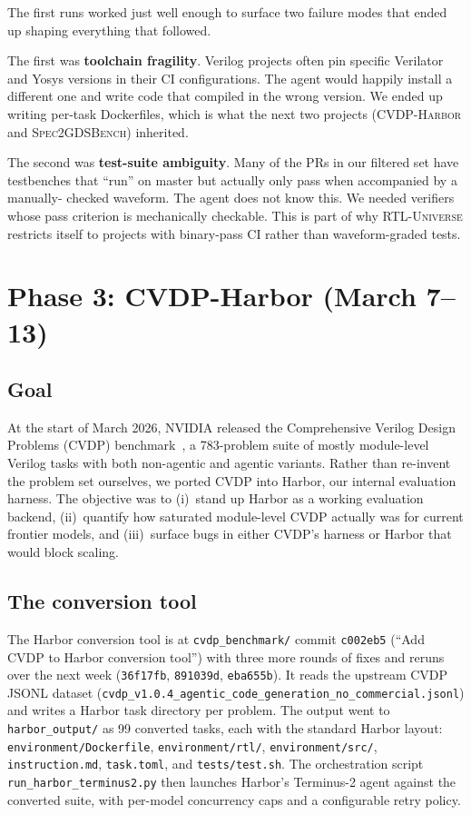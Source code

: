 \documentclass{article}
\begin{document}
The first runs worked just well enough to surface two failure modes that ended up shaping
everything that followed.

The first was \textbf{toolchain fragility}. Verilog projects often pin specific Verilator
and Yosys versions in their CI configurations. The agent would happily install a different
one and write code that compiled in the wrong version. We ended up writing per-task
Dockerfiles, which is what the next two projects (\textsc{CVDP-Harbor} and
\textsc{Spec2GDSBench}) inherited.

The second was \textbf{test-suite ambiguity}. Many of the PRs in our filtered set have
testbenches that ``run'' on master but actually only pass when accompanied by a manually-
checked waveform. The agent does not know this. We needed verifiers whose pass criterion
is mechanically checkable. This is part of why \textsc{RTL-Universe} restricts itself to
projects with binary-pass CI rather than waveform-graded tests.

\section{Phase 3: CVDP-Harbor (March 7--13)}
\label{sec:cvdp}

\subsection{Goal}

At the start of March 2026, NVIDIA released the Comprehensive Verilog Design Problems
(CVDP) benchmark~\citep{nvidia2024cvdp}, a 783-problem suite of mostly module-level Verilog
tasks with both non-agentic and agentic variants. Rather than re-invent the problem set
ourselves, we ported CVDP into Harbor, our internal evaluation harness. The objective was
to (i)~stand up Harbor as a working evaluation backend, (ii)~quantify how saturated
module-level CVDP actually was for current frontier models, and (iii)~surface bugs in
either CVDP's harness or Harbor that would block scaling.

\subsection{The conversion tool}

The Harbor conversion tool is at \texttt{cvdp\_benchmark/} commit \texttt{c002eb5}
(``Add CVDP to Harbor conversion tool'') with three more rounds of fixes and reruns over
the next week (\texttt{36f17fb}, \texttt{891039d}, \texttt{eba655b}). It reads the upstream
CVDP JSONL dataset (\texttt{cvdp\_v1.0.4\_agentic\_code\_generation\_no\_commercial.jsonl})
and writes a Harbor task directory per problem. The output went to
\texttt{harbor\_output/} as 99 converted tasks, each with the standard Harbor layout:
\texttt{environment/Dockerfile}, \texttt{environment/rtl/}, \texttt{environment/src/},
\texttt{instruction.md}, \texttt{task.toml}, and \texttt{tests/test.sh}. The orchestration
script \texttt{run\_harbor\_terminus2.py} then launches Harbor's Terminus-2 agent against
the converted suite, with per-model concurrency caps and a configurable retry policy.
\end{document}
